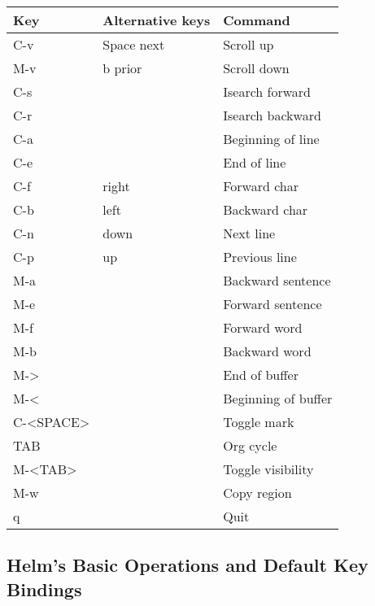 \documentclass[11pt]{article}
\begin{document}
\begin{center}
\begin{tabular}{lll}
Key & Alternative keys & Command\\
\hline
C-v & Space next & Scroll up\\
M-v & b prior & Scroll down\\
C-s &  & Isearch forward\\
C-r &  & Isearch backward\\
C-a &  & Beginning of line\\
C-e &  & End of line\\
C-f & right & Forward char\\
C-b & left & Backward char\\
C-n & down & Next line\\
C-p & up & Previous line\\
M-a &  & Backward sentence\\
M-e &  & Forward sentence\\
M-f &  & Forward word\\
M-b &  & Backward word\\
M-> &  & End of buffer\\
M-< &  & Beginning of buffer\\
C-<SPACE> &  & Toggle mark\\
TAB &  & Org cycle\\
M-<TAB> &  & Toggle visibility\\
M-w &  & Copy region\\
q &  & Quit\\
\end{tabular}
\end{center}


\subsection{Helm’s Basic Operations and Default Key Bindings}
\label{sec:org3b736a8}
\end{document}
